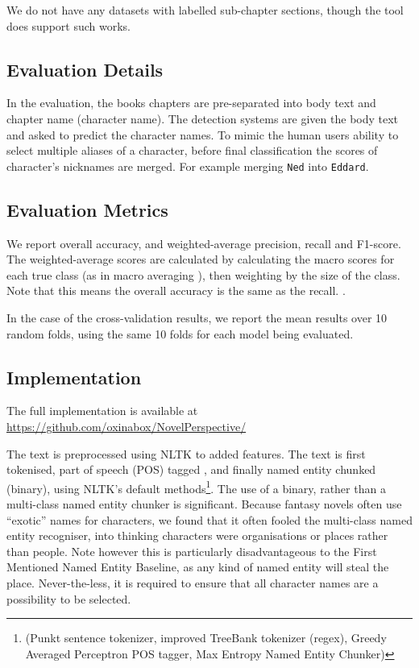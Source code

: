 \documentclass[11pt,a4paper]{article}
\newcommand{\parencite}{\citep}
\begin{document}
We do not have any datasets with labelled sub-chapter sections,
though the tool does support such works.

\subsection{Evaluation Details}
In the evaluation, the books chapters are pre-separated into body text and chapter name (character name).
The detection systems are given the body text and asked to predict the character names.
To mimic the human users ability to select multiple aliases of a character, before final classification the scores of character's nicknames are merged.
For example merging \texttt{Ned} into \texttt{Eddard}.

\subsection{Evaluation Metrics}
We report overall accuracy, and weighted-average precision, recall and F1-score.
The weighted-average scores are calculated by calculating the macro scores for each true class (as in macro averaging \parencite{SOKOLOVA2009427}), then weighting by the size of the class.
Note that this means the overall accuracy is the same as the recall.
.

In the case of the cross-validation results, we report the mean results over 10 random folds, using the same 10 folds for each model being evaluated.

\subsection{Implementation}
The full implementation is available at \url{https://github.com/oxinabox/NovelPerspective/}

The text is preprocessed using NLTK \parencite{bird2009natural} to added features.
The text is first tokenised, part of speech (POS) tagged , and finally named entity chunked (binary), using NLTK's default methods\footnote{(Punkt sentence tokenizer, improved TreeBank tokenizer (regex), Greedy Averaged Perceptron POS tagger, Max Entropy Named Entity Chunker)}.
The use of a binary, rather than a multi-class named entity chunker is significant.
Because fantasy novels often use ``exotic'' names for characters, we found that it often  fooled the multi-class named entity recogniser, into thinking characters were organisations or places rather than people.
Note however this is particularly disadvantageous to the First Mentioned Named Entity Baseline, as any kind of named entity will steal the place.
Never-the-less, it is required to ensure that all character names are a possibility to be selected.
\end{document}
